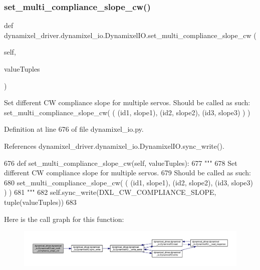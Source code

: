 \subsubsection{\texorpdfstring{set\+\_\+multi\+\_\+compliance\+\_\+slope\+\_\+cw()}{set\_multi\_compliance\_slope\_cw()}}
{\footnotesize\ttfamily def dynamixel\+\_\+driver.\+dynamixel\+\_\+io.\+Dynamixel\+I\+O.\+set\+\_\+multi\+\_\+compliance\+\_\+slope\+\_\+cw (\begin{DoxyParamCaption}\item[{}]{self,  }\item[{}]{value\+Tuples }\end{DoxyParamCaption})}

\begin{DoxyVerb}Set different CW compliance slope for multiple servos.
Should be called as such:
set_multi_compliance_slope_cw( ( (id1, slope1), (id2, slope2), (id3, slope3) ) )
\end{DoxyVerb}
 

Definition at line 676 of file dynamixel\+\_\+io.\+py.



References dynamixel\+\_\+driver.\+dynamixel\+\_\+io.\+Dynamixel\+I\+O.\+sync\+\_\+write().


\begin{DoxyCode}
676     \textcolor{keyword}{def }set\_multi\_compliance\_slope\_cw(self, valueTuples):
677         \textcolor{stringliteral}{"""}
678 \textcolor{stringliteral}{        Set different CW compliance slope for multiple servos.}
679 \textcolor{stringliteral}{        Should be called as such:}
680 \textcolor{stringliteral}{        set\_multi\_compliance\_slope\_cw( ( (id1, slope1), (id2, slope2), (id3, slope3) ) )}
681 \textcolor{stringliteral}{        """}
682         self.sync\_write(DXL\_CW\_COMPLIANCE\_SLOPE, tuple(valueTuples))
683 
\end{DoxyCode}
Here is the call graph for this function\+:
\nopagebreak
\begin{figure}[H]
\begin{center}
\leavevmode
\includegraphics[width=350pt]{dd/d77/classdynamixel__driver_1_1dynamixel__io_1_1_dynamixel_i_o_a115695cc45ce343d0787fcc3c0bf6e7b_cgraph}
\end{center}
\end{figure}
\mbox{\label{classdynamixel__driver_1_1dynamixel__io_1_1_dynamixel_i_o_af3b2a4bd581266a9dd067a0c1f34687a}} 
